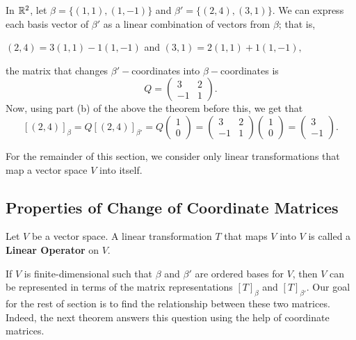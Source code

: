 \begin{eg}\label{Example 2.5.1}
    In \(  \mathbb{R}^{2} \), let \( \beta = \{ (1,1), (1,-1) \}  \) and \( \beta' = \{ (2,4), (3,1) \}  \). We can express each basis vector of \( \beta'  \) as a linear combination of vectors from \( \beta \); that is, 
    \begin{center}
        \( (2,4) = 3(1,1) - 1(1,-1) \) and \( (3,1) = 2(1,1) + 1(1,-1), \)
    \end{center} the matrix that changes \( \beta'- \)coordinates into \( \beta- \)coordinates is 
    \[ Q = \begin{pmatrix}
        3 & 2 \\
        -1 & 1 
    \end{pmatrix}.  \]
    Now, using part (b) of the above the theorem before this, we get that
    \[  [(2,4)]_{\beta} = Q [(2,4)]_{\beta'} = Q \begin{pmatrix}
        1 \\
        0
    \end{pmatrix} = \begin{pmatrix}
    3 & 2 \\
    -1 & 1 
    \end{pmatrix} \begin{pmatrix}
        1 \\
        0
    \end{pmatrix} = \begin{pmatrix}
        3 \\
        -1
    \end{pmatrix}. \]
\end{eg}

For the remainder of this section, we consider only linear transformations that map a vector space \( V  \) into itself. 

\subsection{Properties of Change of Coordinate Matrices}

\begin{definition}
    Let \( V  \) be a vector space. A linear transformation \( T \) that maps \( V  \) into \( V  \) is called a \textbf{Linear Operator} on \( V  \).
\end{definition}

If \( V  \) is finite-dimensional such that \( \beta \) and \( \beta'  \) are ordered bases for \( V  \), then \( V  \) can be represented in terms of the matrix representations \( [T]_{\beta} \) and \( [T]_{\beta'} \). Our goal for the rest of section is to find the relationship between these two matrices. Indeed, the next theorem answers this question using the help of coordinate matrices.

